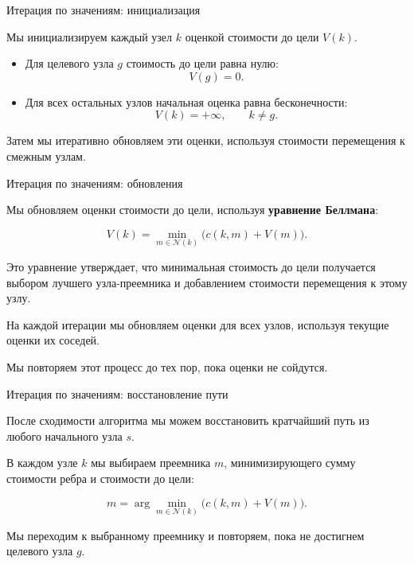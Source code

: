\documentclass{beamer}
\begin{document}
	\begin{frame}{Итерация по значениям: инициализация}
		\begin{flushleft}
			
			Мы инициализируем каждый узел $k$ оценкой стоимости до цели
			$V(k)$.
			
			\begin{itemize}
				\item Для целевого узла $g$ стоимость до цели
				равна нулю:
				\[
				V(g)=0.
				\]
				
				\item Для всех остальных узлов начальная оценка
				равна бесконечности:
				\[
				V(k)=+\infty,\qquad k\ne g.
				\]
			\end{itemize}
			
			Затем мы итеративно обновляем эти оценки, используя
			стоимости перемещения к смежным узлам.
			
		\end{flushleft}
	\end{frame}
	
	\begin{frame}{Итерация по значениям: обновления}
		\begin{flushleft}
			
			Мы обновляем оценки стоимости до цели, используя
			\textbf{уравнение Беллмана}:
			
			\[
			V(k)=\min_{m\in\mathcal{N}(k)}
			\bigl(c(k,m)+V(m)\bigr).
			\]
			
			Это уравнение утверждает, что минимальная стоимость
			до цели получается выбором лучшего
			узла-преемника и добавлением стоимости перемещения
			к этому узлу.
			
			\medskip
			На каждой итерации мы обновляем оценки для
			всех узлов, используя текущие оценки их
			соседей.
			
			\medskip
			Мы повторяем этот процесс до тех пор, пока оценки
			не сойдутся.
			
		\end{flushleft}
	\end{frame}
	
	\begin{frame}{Итерация по значениям: восстановление пути}
		\begin{flushleft}
			
			После сходимости алгоритма мы можем восстановить
			кратчайший путь из любого начального узла $s$.
			
			\medskip
			В каждом узле $k$ мы выбираем преемника $m$,
			минимизирующего сумму стоимости ребра и
			стоимости до цели:
			
			\[
			m=\arg\min_{m\in\mathcal{N}(k)}
			\bigl(c(k,m)+V(m)\bigr).
			\]
			
			Мы переходим к выбранному преемнику и повторяем,
			пока не достигнем целевого узла $g$.
			
		\end{flushleft}
	\end{frame}
	
\end{document}
